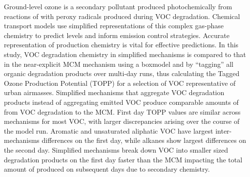 Ground-level ozone is a secondary pollutant produced photochemically from reactions of  with peroxy radicals produced during VOC degradation. 
Chemical transport models use simplified representations of this complex gas-phase chemistry to predict  levels and inform emission control strategies. 
Accurate representation of  production chemistry is vital for effective predictions.
In this study, VOC degradation chemistry in simplified mechanisms is compared to that in the near-explicit MCM mechanism using a boxmodel and by ``tagging'' all organic degradation products over multi-day runs, thus calculating the Tagged Ozone Production Potential (TOPP) for a selection of VOC representative of urban airmasses.
Simplified mechanisms that aggregate VOC degradation products instead of aggregating emitted VOC produce comparable amounts of  from VOC degradation to the MCM.
First day TOPP values are similar across mechanisms for most VOC, with larger discrepancies arising over the course of the model run.
Aromatic and unsaturated aliphatic VOC have largest inter-mechanisms differences on the first day, while alkanes show largest differences on the second day.
Simplified mechanisms break down VOC into smaller sized degradation products on the first day faster than the MCM impacting the total amount of  produced on subsequent days due to secondary chemistry.
